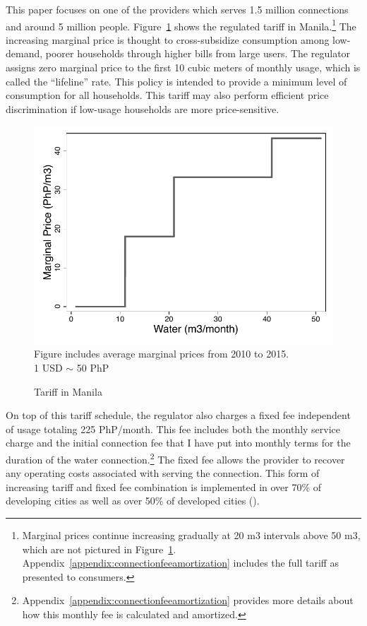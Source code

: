 \documentclass[12pt]{article}
\begin{document}
This paper focuses on one of the providers which serves 1.5 million connections and around 5 million people.  Figure~\ref{figure:tariff} shows the regulated tariff in Manila.\footnote{Marginal prices continue increasing gradually at 20 m3 intervals above 50 m3, which are not pictured in Figure~\ref{figure:tariff}.  Appendix~\ref{appendix:connectionfeeamortization} includes the full tariff as presented to consumers.}  The increasing marginal price is thought to cross-subsidize consumption among low-demand, poorer households through higher bills from large users.  The regulator assigns zero marginal price to the first 10 cubic meters of monthly usage, which is called the ``lifeline'' rate.  This policy is intended to provide a minimum level of consumption for all households.  This tariff may also perform efficient price discrimination if low-usage households are more price-sensitive.
\begin{figure}
\centering
\caption{Tariff in Manila}\label{figure:tariff}
\begin{center}
\includegraphics[scale=.7]{tables/tariff_structure.pdf}\\
\footnotesize{Figure includes average marginal prices from 2010 to 2015. \\  1 USD $\sim$ 50 PhP}
\end{center}
\end{figure}
On top of this tariff schedule, the regulator also charges a fixed fee independent of usage totaling 225 PhP/month.  This fee includes both the monthly service charge and the initial connection fee that I have put into monthly terms for the duration of the water connection.\footnote{Appendix~\ref{appendix:connectionfeeamortization} provides more details about how this monthly fee is calculated and amortized.}  The fixed fee allows the provider to recover any operating costs associated with serving the connection.  This form of increasing tariff and fixed fee combination is implemented in over 70\% of developing cities as well as over 50\% of developed cities (\cite{hoque2013state}).
\end{document}
